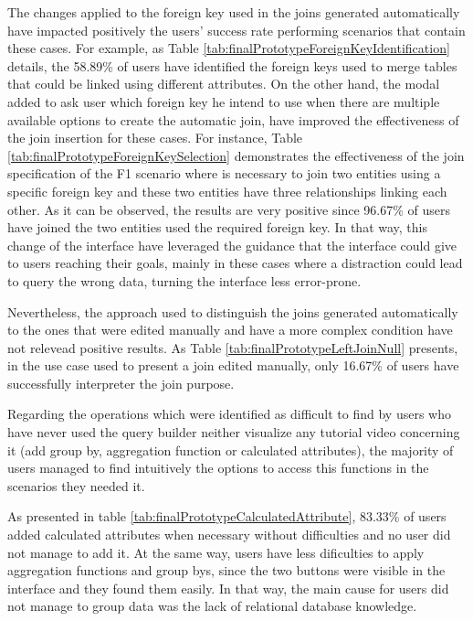 The changes applied to the foreign key used in the joins generated automatically have impacted positively the users' success rate performing scenarios that contain these cases. For example, as Table \ref{tab:finalPrototypeForeignKeyIdentification} details, the 58.89\% of users have identified the foreign keys used to merge tables that could be linked using different attributes. On the other hand, the modal added to ask user which foreign key he intend to use when there are multiple available options to create the automatic join, have improved the effectiveness of the join insertion for these cases. For instance, Table \ref{tab:finalPrototypeForeignKeySelection} demonstrates the effectiveness of the join specification of the F1 scenario where is necessary to join two entities using a specific foreign key and these two entities have three relationships linking each other. As it can be observed, the results are very positive since 96.67\% of users have joined the two entities used the required foreign key. In that way, this change of the interface have leveraged the guidance that the interface could give to users reaching their goals, mainly in these cases where a distraction could lead to query the wrong data, turning the interface less error-prone.

Nevertheless, the approach used to distinguish the joins generated automatically to the ones that were edited manually and have a more complex condition have not relevead positive results. As Table \ref{tab:finalPrototypeLeftJoinNull} presents, in the use case used to present a join edited manually, only 16.67\% of users have successfully interpreter the join purpose.



Regarding the operations which were identified as difficult to find by users who have never used the query builder neither visualize any tutorial video concerning it (add group by, aggregation function or calculated attributes), the majority of users managed to find intuitively the options to access this functions in the scenarios they needed it.

As presented in table \ref{tab:finalPrototypeCalculatedAttribute}, 83.33\% of users added calculated attributes when necessary without difficulties and no user did not manage to add it. At the same way, users have less dificulties to apply aggregation functions and group bys, since the two buttons were visible in the interface and they found them easily. In that way, the main cause for users did not manage to group data was the lack of relational database knowledge.

